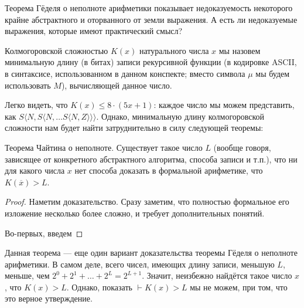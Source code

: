 Теорема Гёделя о неполноте арифметики показывает недоказуемость некоторого крайне абстрактного и 
оторванного от земли выражения. А есть ли недоказуемые выражения, которые имеют практический смысл?

\begin{definition}Колмогоровской сложностью $K(x)$ натурального числа $x$ мы назовем 
минимальную длину (в битах) записи рекурсивной функции (в кодировке ASCII, в синтаксисе,
использованном в данном конспекте; вместо символа $\mu$ мы будем использовать $M$), 
вычисляющей данное число.
\end{definition}

Легко видеть, что $K(x) \le 8\cdot(5x + 1)$: каждое число мы можем представить, как
$S \langle N, S \langle N, \dots S \langle N,Z \rangle \rangle \rangle$.
Однако, минимальную длину колмогоровской сложности нам будет найти затруднительно 
в силу следующей теоремы:

\begin{theorem}Теорема Чайтина о неполноте. Существует такое число $L$ (вообще говоря,
зависящее от конкретного абстрактного алгоритма, способа записи и т.п.), что
ни для какого числа $x$ нет способа доказать в формальной арифметике, что 
$K(\overline{x}) > L$.
\end{theorem}

\begin{proof}
Наметим доказательство. Сразу заметим, что полностью формальное его изложение несколько более
сложно, и требует дополнительных понятий.

Во-первых, введем 
\end{proof}

Данная теорема --- еще один вариант доказательства теоремы Гёделя о неполноте арифметики. 
В самом деле, всего чисел, имеющих длину записи, меньшую $L$, меньше, чем $2^0+2^1+\dots+2^L=2^{L+1}$.
Значит, неизбежно найдётся такое число $x$, что $K(x) > L$. Однако, показать
$\vdash K(x) > L$ мы не можем, при том, что это верное утверждение.

